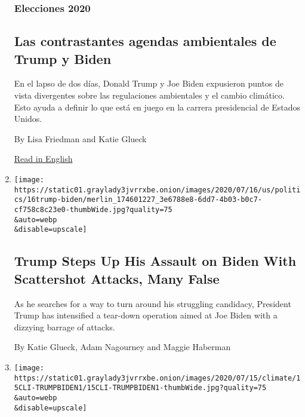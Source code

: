 \begin{enumerate}
  \hypertarget{elecciones-2020}{%
  \subsubsection{Elecciones 2020}\label{elecciones-2020}}

  \hypertarget{las-contrastantes-agendas-ambientales-de-trump-y-biden}{%
  \subsection{Las contrastantes agendas ambientales de Trump y
  Biden}\label{las-contrastantes-agendas-ambientales-de-trump-y-biden}}

  En el lapso de dos días, Donald Trump y Joe Biden expusieron puntos de
  vista divergentes sobre las regulaciones ambientales y el cambio
  climático. Esto ayuda a definir lo que está en juego en la carrera
  presidencial de Estados Unidos.

  By Lisa Friedman and Katie Glueck

  \href{https://www.nytimes3xbfgragh.onion/2020/07/15/climate/trump-biden-environment.html}{Read
  in English}
\item
  \href{/2020/07/17/us/trump-biden-2020-election.html}{}

  \texttt{[image: https://static01.graylady3jvrrxbe.onion/images/2020/07/16/us/politics/16trump-biden/merlin\_174601227\_3e6788e8-6dd7-4b03-b0c7-cf758c8c23e0-thumbWide.jpg?quality=75\\\&auto=webp\\\&disable=upscale]}

  \hypertarget{trump-steps-up-his-assault-on-biden-with-scattershot-attacks-many-false}{%
  \subsection{Trump Steps Up His Assault on Biden With Scattershot
  Attacks, Many
  False}\label{trump-steps-up-his-assault-on-biden-with-scattershot-attacks-many-false}}

  As he searches for a way to turn around his struggling candidacy,
  President Trump has intensified a tear-down operation aimed at Joe
  Biden with a dizzying barrage of attacks.

  By Katie Glueck, Adam Nagourney and Maggie Haberman
\item
  \href{/2020/07/15/climate/trump-biden-environment.html}{}

  \texttt{[image: https://static01.graylady3jvrrxbe.onion/images/2020/07/15/climate/15CLI-TRUMPBIDEN1/15CLI-TRUMPBIDEN1-thumbWide.jpg?quality=75\\\&auto=webp\\\&disable=upscale]}


\end{enumerate}
